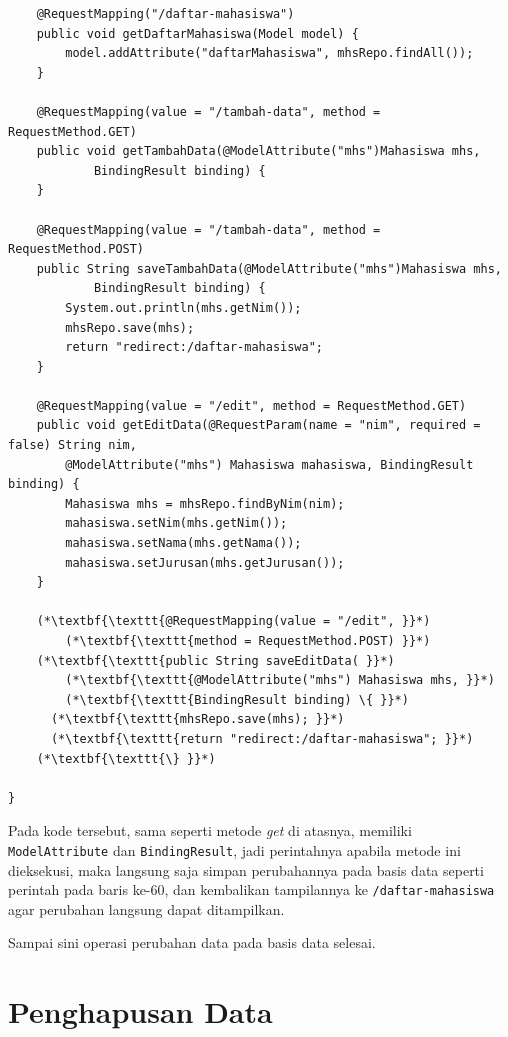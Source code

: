 \begin{enumerate}
\begin{lstlisting}
    @RequestMapping("/daftar-mahasiswa") 
    public void getDaftarMahasiswa(Model model) {
        model.addAttribute("daftarMahasiswa", mhsRepo.findAll());
    }
    
    @RequestMapping(value = "/tambah-data", method = RequestMethod.GET)
    public void getTambahData(@ModelAttribute("mhs")Mahasiswa mhs, 
            BindingResult binding) {
    }
    
    @RequestMapping(value = "/tambah-data", method = RequestMethod.POST) 
    public String saveTambahData(@ModelAttribute("mhs")Mahasiswa mhs,
            BindingResult binding) {
        System.out.println(mhs.getNim());
        mhsRepo.save(mhs);
        return "redirect:/daftar-mahasiswa";
    }

    @RequestMapping(value = "/edit", method = RequestMethod.GET)
    public void getEditData(@RequestParam(name = "nim", required = false) String nim, 
    	@ModelAttribute("mhs") Mahasiswa mahasiswa, BindingResult binding) {
    	Mahasiswa mhs = mhsRepo.findByNim(nim);
    	mahasiswa.setNim(mhs.getNim());
    	mahasiswa.setNama(mhs.getNama());
    	mahasiswa.setJurusan(mhs.getJurusan());
    }

    (*\textbf{\texttt{@RequestMapping(value = "/edit", }}*) 
        (*\textbf{\texttt{method = RequestMethod.POST) }}*)
    (*\textbf{\texttt{public String saveEditData( }}*)
        (*\textbf{\texttt{@ModelAttribute("mhs") Mahasiswa mhs, }}*)
        (*\textbf{\texttt{BindingResult binding) \{ }}*)
      (*\textbf{\texttt{mhsRepo.save(mhs); }}*)
      (*\textbf{\texttt{return "redirect:/daftar-mahasiswa"; }}*)
    (*\textbf{\texttt{\} }}*)
    
}
	\end{lstlisting}
	
	Pada kode tersebut, sama seperti metode \textit{get} di atasnya, memiliki \texttt{ModelAttribute} dan \texttt{BindingResult}, jadi perintahnya apabila metode ini dieksekusi, maka langsung saja simpan perubahannya pada basis data seperti perintah pada baris ke-60, dan kembalikan tampilannya ke \texttt{/daftar-mahasiswa} agar perubahan langsung dapat ditampilkan.
	
	Sampai sini operasi perubahan data pada basis data selesai.

\end{enumerate}

\section{Penghapusan Data}

